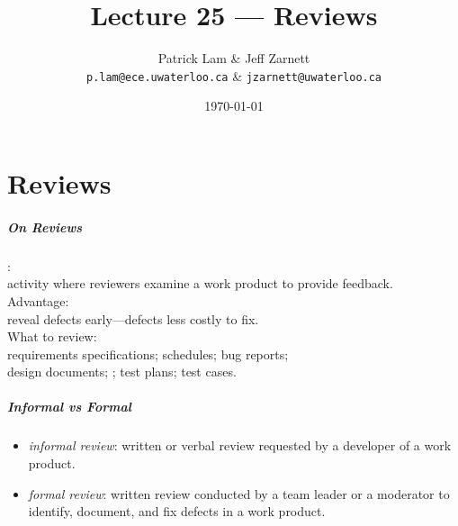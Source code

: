 

\title{Lecture 25 --- Reviews}

\author{Patrick Lam \& Jeff Zarnett \\ \small \texttt{p.lam@ece.uwaterloo.ca} \& \texttt{jzarnett@uwaterloo.ca}}
\date{\today}



\begin{frame}
  \titlepage
\end{frame}

\part{Reviews}
\frame{\partpage}

\begin{frame}
\frametitle{On Reviews}

\begin{changemargin}{1cm}

: \\activity where reviewers examine a work product
to provide feedback.\\[1em]

Advantage: \\
reveal defects early---defects less costly to fix.  \\[1em]

What to review:\\
requirements specifications; schedules; bug reports; \\design documents;
; test plans; test cases.

\end{changemargin}

\end{frame}

\begin{frame}
\frametitle{Informal vs Formal}

\large
\begin{changemargin}{1cm}
\begin{itemize}
\item \emph{informal review}: written or verbal review
  requested by a developer of a work product.\\[1em]
\item \emph{formal review}: written review conducted by a team
  leader or a moderator to identify, document,
  and fix defects in a work product.  
\end{itemize}
\end{changemargin}

\end{frame}

